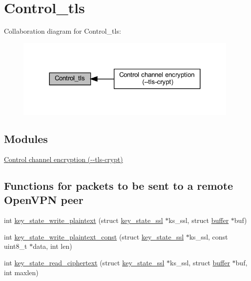 \hypertarget{group__control__tls}{}\section{Control\+\_\+tls}
\label{group__control__tls}
Collaboration diagram for Control\+\_\+tls\+:
\nopagebreak
\begin{figure}[H]
\begin{center}
\leavevmode
\includegraphics[width=311pt]{group__control__tls}
\end{center}
\end{figure}
\subsection*{Modules}
\begin{DoxyCompactItemize}
\item 
\hyperlink{group__tls__crypt}{Control channel encryption (-\/-\/tls-\/crypt)}
\end{DoxyCompactItemize}
\subsection*{Functions for packets to be sent to a remote Open\+V\+P\+N peer}
\begin{DoxyCompactItemize}
\item 
int \hyperlink{group__control__tls_gaa5438c5f4b03dafec41e663a3e5734d0}{key\+\_\+state\+\_\+write\+\_\+plaintext} (struct \hyperlink{structkey__state__ssl}{key\+\_\+state\+\_\+ssl} $\ast$ks\+\_\+ssl, struct \hyperlink{structbuffer}{buffer} $\ast$buf)
\item 
int \hyperlink{group__control__tls_ga67dac3b75328d8b92d3f1a69e86dacdc}{key\+\_\+state\+\_\+write\+\_\+plaintext\+\_\+const} (struct \hyperlink{structkey__state__ssl}{key\+\_\+state\+\_\+ssl} $\ast$ks\+\_\+ssl, const uint8\+\_\+t $\ast$data, int len)
\item 
int \hyperlink{group__control__tls_ga7260a351c5bb3bf22628278e09f2f7b3}{key\+\_\+state\+\_\+read\+\_\+ciphertext} (struct \hyperlink{structkey__state__ssl}{key\+\_\+state\+\_\+ssl} $\ast$ks\+\_\+ssl, struct \hyperlink{structbuffer}{buffer} $\ast$buf, int maxlen)
\end{DoxyCompactItemize}

